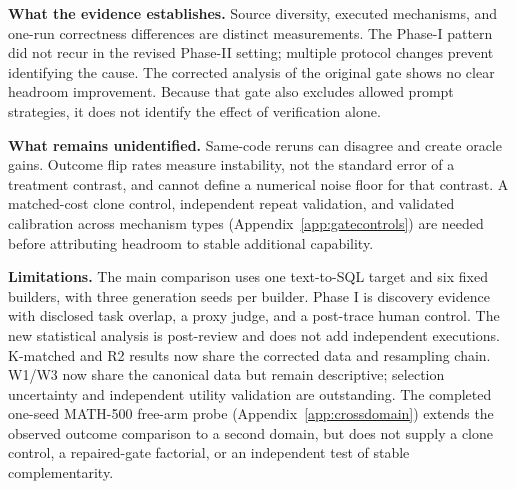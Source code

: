 \textbf{What the evidence establishes.} Source diversity, executed
mechanisms, and one-run correctness differences are distinct measurements.
The Phase-I pattern did not recur in the revised Phase-II setting; multiple
protocol changes prevent identifying the cause. The corrected analysis of
the original gate shows no clear headroom improvement. Because that gate
also excludes allowed prompt strategies, it does not identify the effect
of verification alone.

\textbf{What remains unidentified.} Same-code reruns can disagree and
create oracle gains. Outcome flip rates measure instability, not the
standard error of a treatment contrast, and cannot define a numerical
noise floor for that contrast. A matched-cost clone control, independent
repeat validation, and validated calibration across mechanism types
(Appendix~\ref{app:gatecontrols})
are needed before attributing headroom to stable additional capability.

\textbf{Limitations.} The main comparison uses one text-to-SQL target and
six fixed builders, with three generation seeds per builder. Phase I is
discovery evidence with disclosed task overlap, a proxy judge, and a
post-trace human control. The new statistical analysis is post-review and
does not add independent executions. K-matched and R2 results now share the
corrected data and resampling chain. W1/W3 now share the canonical data
but remain descriptive; selection uncertainty and independent utility
validation are outstanding.
The completed one-seed MATH-500 free-arm probe
(Appendix~\ref{app:crossdomain}) extends the observed outcome comparison
to a second domain, but does not supply a clone control, a repaired-gate
factorial, or an independent test of stable complementarity.
